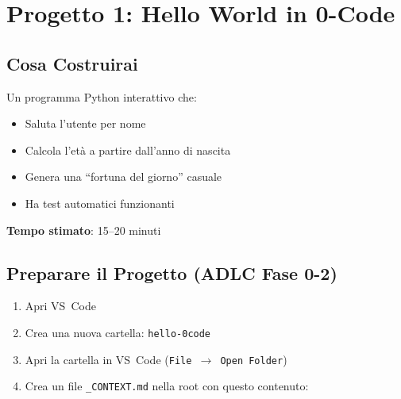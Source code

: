 \chapter{Progetto 1: Hello World in 0-Code}

\section*{Cosa Costruirai}
Un programma Python interattivo che:
\begin{itemize}
  \item Saluta l'utente per nome
  \item Calcola l'età a partire dall'anno di nascita
  \item Genera una ``fortuna del giorno'' casuale
  \item Ha test automatici funzionanti
\end{itemize}

\textbf{Tempo stimato}: 15--20 minuti

\section{Preparare il Progetto (ADLC Fase 0-2)}

\begin{praticabox}[title={Pratica --- Setup iniziale}]
\begin{enumerate}
  \item Apri VS~Code
  \item Crea una nuova cartella: \texttt{hello-0code}
  \item Apri la cartella in VS~Code (\texttt{File $\rightarrow$ Open Folder})
  \item Crea un file \texttt{\_CONTEXT.md} nella root con questo contenuto:
\end{enumerate}
\end{praticabox}

